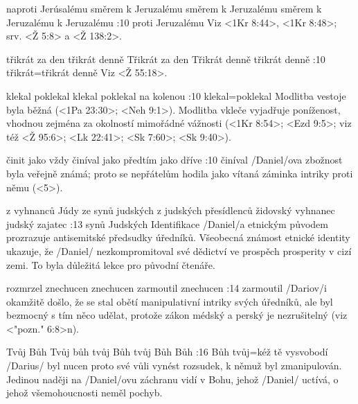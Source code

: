     {naproti Jerúsalému}  %
    {směrem k Jeruzalému}  %
    {směrem k Jeruzalému}  %
    {směrem k Jeruzalému}  %
    {k Jeruzalému}  %
:10 {proti Jeruzalému} Viz <1Kr 8:44>, <1Kr 8:48>; srv. <Ž 5:8> a <Ž 138:2>.       

    {třikrát za den} %
    {třikrát denně}  %
    {Třikrát za den} %
    {Třikrát denně}  %
    {třikrát denně}  %
:10 {třikrát}={třikrát denně} Viz <Ž 55:18>.     

 
    {klekal} %
    {poklekal}  %
    {klekal} %
    {poklekal}  %
    {na kolenou}  %
:10 {klekal}={poklekal} Modlitba vestoje byla běžná (<1Pa 23:30>; <Neh 9:1>).      
                               Modlitba vkleče vyjadřuje poníženost, vhodnou zejména za okolností mimořádné vážnosti 
                               (<1Kr 8:54>; <Ezd 9:5>; viz též <Ž 95:6>; <Lk 22:41>; <Sk 7:60>; <Sk 9:40>).  
                               
    {činit}  %
    {jako vždy}  %
    {činíval}  %
    {jako předtím}  %
    {jako dříve}  %
:10 {činíval} \x/Daniel/ova zbožnost byla veřejně známá; proto se nepřátelům hodila jako vítaná záminka intriky proti němu  (<5>).     

    {z vyhnanců Júdy}  %
    {ze synů judských}  %
    {z judských přesídlenců}  %
    {židovský vyhnanec}  %
    {judský zajatec}  %
:13 {synů Judských} Identifikace \x/Daniel/a etnickým původem prozrazuje antisemitské předsudky úředníků. Všeobecná známost etnické identity ukazuje, že \x/Daniel/ nezkompromitoval své dědictví ve prospěch prosperity v cizí zemi. To byla důležitá lekce pro původní čtenáře. 

    {rozmrzel}  %
    {znechucen}  %
    {znechucen}  %
    {zarmoutil}  %
    {znechucen}  %
:14 {zarmoutil} \x/Dariov/i okamžitě došlo, že se stal obětí manipulativní  intriky svých  úředníků, ale byl bezmocný s tím něco udělat, protože zákon médský a perský je nezrušitelný (viz <"pozn." 6:8>n).     

    {Tvůj Bůh}  %
    {Tvůj bůh}  %
    {tvůj Bůh}  %
    {tvůj Bůh}  %
    {Bůh}  %
:16 {Bůh tvůj}={kéž tě vysvobodí} \x/Darius/ byl nucen proto své vůli vynést rozsudek, k němuž byl zmanipulován. Jedinou naději na \x/Daniel/ovu záchranu vidí v Bohu, jehož \x/Daniel/ uctívá, o jehož všemohoucnosti neměl pochyb. %


